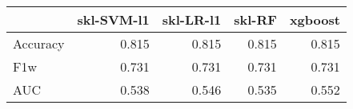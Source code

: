 \begin{tabular}{lrrrr}
\toprule
{} &  skl-SVM-l1 &  skl-LR-l1 &  skl-RF &  xgboost \\
\midrule
Accuracy &       0.815 &      0.815 &   0.815 &    0.815 \\
F1w      &       0.731 &      0.731 &   0.731 &    0.731 \\
AUC      &       0.538 &      0.546 &   0.535 &    0.552 \\
\bottomrule
\end{tabular}
